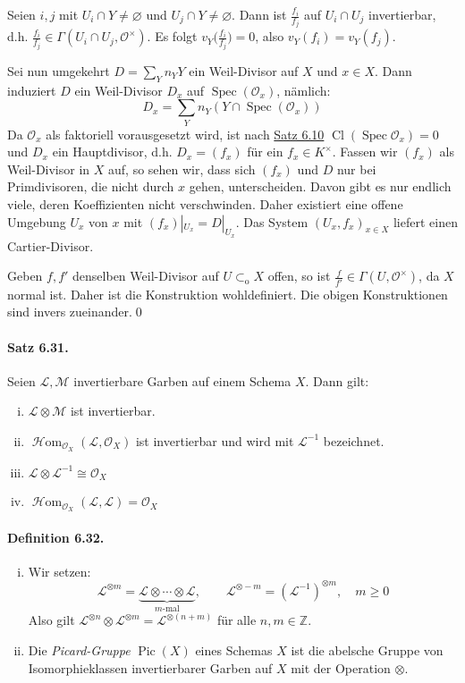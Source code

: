 Seien $i,j$ mit $U_i\cap Y\neq\varnothing$ und $U_j\cap Y\neq\varnothing$. Dann ist $\frac{f_i}{f_j}$ auf $U_i\cap U_j$ invertierbar, d.h. $\frac{f_i}{f_j}\in\Gamma(U_i\cap U_j,\mathcal{O}^\times)$. Es folgt $v_Y\big(\frac{f_i}{f_j}\big)=0$, also $v_Y(f_i)=v_Y(f_j)$.

Sei nun umgekehrt $D=\sum_Yn_YY$ ein Weil-Divisor auf $X$ und $x\in X$. Dann induziert $D$ ein Weil-Divisor $D_x$ auf $\operatorname{Spec}(\mathcal{O}_x)$, nämlich:
\[D_x=\sum_Y n_Y(Y\cap\operatorname{Spec}(\mathcal{O}_x)) \]
Da $\mathcal{O}_x$ als faktoriell vorausgesetzt wird, ist nach \hyperref[6.10]{Satz 6.10} $\operatorname{Cl}(\operatorname{Spec}\mathcal{O}_x)=0$ und $D_x$ ein Hauptdivisor, d.h. $D_x=(f_x)$ für ein $f_x\in K^\times$. Fassen wir $(f_x)$ als Weil-Divisor in $X$ auf, so sehen wir, dass sich $(f_x)$ und $D$ nur bei Primdivisoren, die nicht durch $x$ gehen, unterscheiden. Davon gibt es nur endlich viele, deren Koeffizienten nicht verschwinden. Daher existiert eine offene Umgebung $U_x$ von $x$ mit $(f_x)|_{U_x}=D|_{U_x}$. Das System $(U_x,f_x)_{x\in X}$ liefert einen Cartier-Divisor.

Geben $f,f'$ denselben Weil-Divisor auf $U\subset_\text{o}X$ offen, so ist $\frac{f}{f'}\in\Gamma(U,\mathcal{O}^\times)$, da $X$ normal ist. Daher ist die Konstruktion wohldefiniert. Die obigen Konstruktionen sind invers zueinander.\qed

\paragraph{Satz 6.31.}\label{6.31} Seien $\mathcal{L},\mathcal{M}$ invertierbare Garben auf einem Schema $X$. Dann gilt:
\begin{enumerate}[(i)]
\item $\mathcal{L}\otimes \mathcal{M}$ ist invertierbar.
\item $\operatorname{\mathcal{H}om}_{\mathcal{O}_X}(\mathcal{L},\mathcal{O}_X)$ ist invertierbar und wird mit $\mathcal{L}^{-1}$ bezeichnet.
\item $\mathcal{L}\otimes\mathcal{L}^{-1}\cong\mathcal{O}_X$
\item $\operatorname{\mathcal{H}om}_{\mathcal{O}_X}(\mathcal{L},\mathcal{L})=\mathcal{O}_X$
\end{enumerate}

\paragraph{Definition 6.32.}\label{6.32}\begin{enumerate}[(i)]
\item Wir setzen:
\[\mathcal{L}^{\otimes m}=\underbrace{\mathcal{L}\otimes\cdots\otimes\mathcal{L}}_{m\text{-mal}},\quad\quad \mathcal{L}^{\otimes -m}=(\mathcal{L}^{-1})^{\otimes m},\quad m\geq 0 \]
Also gilt $\mathcal{L}^{\otimes n}\otimes\mathcal{L}^{\otimes m}=\mathcal{L}^{\otimes (n+m)}$ für alle $n,m\in\mathbb{Z}$.
\item Die \textit{Picard-Gruppe} $\operatorname{Pic}(X)$ eines Schemas $X$ ist die abelsche Gruppe von Isomorphieklassen invertierbarer Garben auf $X$ mit der Operation $\otimes$.
\end{enumerate}

